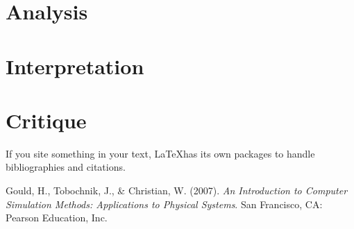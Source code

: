 \documentclass{article}%
\begin{document}
    \section{Analysis}

    \section{Interpretation}

    \section{Critique}
    If you site something in your text, \LaTeX has its own packages to handle bibliographies and citations.

    \begin{thebibliography}{1}
            Gould, H., Tobochnik, J., \& Christian, W. (2007). \textit{An Introduction to Computer Simulation Methods: Applications to Physical Systems}. San Francisco, CA: Pearson Education, Inc.
    \end{thebibliography} 
\end{document}
